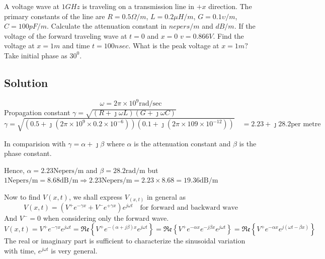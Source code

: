 \begin{exmp}
A voltage wave at ${1GH}z$ is traveling on a transmission line in ${+x}$ direction. The primary constants of the line are ${R=0.5\Omega/m}$, ${L=0.2\mu H/m}$, ${G=0.1\upsilon/m}$, ${C=100pF/m}$. Calculate the attenuation constant in ${nepers/m}$ and ${dB/m}$. If the voltage of the forward traveling wave at ${t=0}$ and ${x=0}$ ${v}=0.866V$. Find the voltage at ${x=1m}$ and time ${t=100nsec}$. What is the peak voltage at ${x=1m?}$ Take initial phase as ${30^0}$.

\subsection*{Solution}
\[\omega = 2\pi\times 10^{9}\text{rad/sec}\]
Propagation constant $\gamma = \sqrt{(R + \jmath\omega L)(G + \jmath\omega C)}$
\begin{dmath*}
\gamma
=\sqrt{(0.5 + \jmath( 2\pi\times 10^{9} \times 0.2\times 10^{-6}))(0.1 + \jmath (2\pi\times 10{9} \times 10^{-12}))} \quad
= 2.23 + \jmath 28.2 \text{per metre}
\end{dmath*}

In comparision with $\gamma = \alpha + \jmath\beta$ where $\alpha$  is the attenuation constant and $\beta$ is the phase constant.

Hence, $\alpha = 2.23 \text{Nepers/m} $ and $\beta = 28.2 \text{rad/m}$ but $1 \text{Nepers/m} = 8.68\text{dB/m}\Rightarrow 2.23 \text{Nepers/m} = 2.23\times8.68= 19.36 \text{dB/m}$

Now to find $V{(x,t)}$, we shall express $V_{(x,t)}$ in general as
\begin{dmath*}
V{(x,t)} = (V^{+}e^{-\gamma x} + V^{-}e^{+\gamma x})e^{j\omega t}\quad\text{for forward and backward wave}
\end{dmath*}
And $ V^{-} = 0 $ when considering only the forward wave.
\begin{dmath*}
V{(x,t)} = V^{+}e^{-\gamma x}e^{j\omega t}
= \mathfrak{Re}\left\lbrace{V^{+}e^{-(\alpha +j\beta)x}e^{j\omega t}}\right\rbrace
=\mathfrak{Re}\left\lbrace{V^{+}e^{-\alpha x}e^{-j\beta x}e^{j\omega t}}\right\rbrace
= \mathfrak{Re}\left\lbrace{V^{+}e^{-\alpha x}e^{j(\omega t - \beta x)}}\right\rbrace
\end{dmath*}
The real or imaginary part is sufficient to characterize the sinusoidal variation with time, ${e^{j\omega t}}$ is very general.


\end{exmp}
